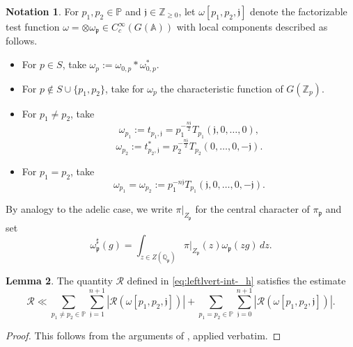 \documentclass[reqno]{amsart}
\theoremstyle{plain} \newtheorem{theorem} {Theorem}
\theoremstyle{definition} \newtheorem{definition} [theorem] {Definition}
\newtheorem{notation} [theorem]        {Notation}
\theoremstyle{itplain} %
\newtheorem{lemma}[theorem]{Lemma}
\numberwithin{equation}{section}
\numberwithin{theorem}{section}
\renewcommand{\geq}{\geqslant}
\begin{document}
\begin{notation}\label{sec:notation-pretr-ineq-mult-3}
  For $p_1, p_2 \in \mathbb{P}$ and $\mathfrak{j} \in \mathbb{Z}_{\geq 0}$, let $\omega[p_1, p_2, \mathfrak{j}]$ denote the factorizable test function $\omega = \otimes \omega_\mathfrak{p} \in C_c^\infty(G(\mathbb{A}))$ with local components described as follows.
  \begin{itemize}
  \item For $p \in S$, take $\omega_p := \omega_{0,p} \ast \omega_{0,p}^*$.
  \item For $p \notin S \cup  \{p_1, p_2\}$, take for $\omega_p$ the characteristic function of $G(\mathbb{Z}_p)$.
  \item For $p_1 \neq p_2$, take
    \begin{equation}\label{eq:omega_p_1-:=-t_p_1}
    \omega_{p_1} :=  t_{p_1,\mathfrak{j}}
      =
      p_1 ^{- \frac{n \mathfrak{j}}{2}} T _{p _1} (\mathfrak{j},0,\dotsc,0),
    \end{equation}
    \begin{equation}\label{eq:omega_p_2-:=-t_p_2}
      \omega_{p_2} :=  t_{p_2,\mathfrak{j}}^* = p_2 ^{- \frac{n \mathfrak{j}}{2}} T _{p _2} (0, \dotsc, 0, -\mathfrak{j}).
    \end{equation}
  \item For $p_1 = p_2$, take
    \begin{equation}\label{eq:omeg-=-omeg}
      \omega_{p_1} = \omega_{p_2} := p_1^{- n \mathfrak{j}} T_{p_1}(\mathfrak{j},0,\dotsc,0,-\mathfrak{j}).
    \end{equation}
  \end{itemize}
  By analogy to the adelic case, we write $\pi|_{Z_\mathfrak{p}}$ for the central character of $\pi_\mathfrak{p}$ and set
  \begin{equation}\label{eq:omeg-=-int}
    \omega_\mathfrak{p}^\sharp(g) = \int _{z \in Z(\mathbb{Q}_\mathfrak{p})} \pi|_{Z_\mathfrak{p}}(z) \omega_\mathfrak{p}(z g) \, d z.
  \end{equation}

\end{notation}
\begin{lemma}
  The quantity $\mathcal{R}$ defined in \eqref{eq:leftlvert-int-_h} satisfies the estimate
  \begin{equation}\label{eq:mathcalr-ll-sum}
  \mathcal{R} \ll \sum _{p_1 \neq p_2 \in \mathbb{P} } \sum _{\mathfrak{j}=1}^{n+1}
  \left\lvert \mathcal{R}(\omega[p_1, p_2, \mathfrak{j}]) \right\rvert
  + \sum _{p_1 = p_2 \in \mathbb{P} } \sum _{\mathfrak{j}=0}^{n+1}
  \left\lvert \mathcal{R} (\omega[p_1, p_2, \mathfrak{j}]) \right\rvert.
\end{equation}
\end{lemma}
\begin{proof}
  This follows from the arguments of \cite[\S6.3]{2020arXiv201202187N}, applied verbatim.
\end{proof}
\end{document}
